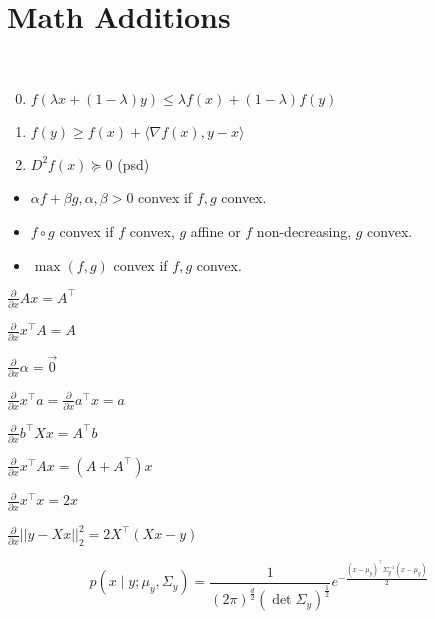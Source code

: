 \section{Math Additions}

\begin{definition}[Convexity] \
  \begin{enumerate}
    \setcounter{enumi}{-1}
    \item \(f(\lambda x + (1 - \lambda) y) \leq \lambda f(x) + (1 - \lambda)f(y)\)
    \item \(f(y) \geq f(x) + \langle \nabla f(x), y - x \rangle\)
    \item \(D^2f(x) \succeq 0\) (psd)
  \end{enumerate}
  \begin{itemize}
    \item \(\alpha f + \beta g, \alpha, \beta > 0\) convex if \(f, g\) convex.
    \item \(f \circ g\) convex if \(f\) convex, \(g\) affine or \(f\) non-decreasing, \(g\) convex.
    \item \(\max(f, g)\) convex if \(f, g\) convex.
  \end{itemize}
\end{definition}

\begin{definition}
  \begin{itemize*}
    \item \(\frac{\partial}{\partial x}Ax = A^\top\) \\
    \item \(\frac{\partial}{\partial x}x^\top A = A\)
    \item \(\frac{\partial}{\partial x} \alpha = \vec{0}\)
    \item \(\frac{\partial}{\partial x}x^\top a = \frac{\partial}{\partial x} a^\top x = a\)
    \item \(\frac{\partial}{\partial x} b^\top X x = A^\top b\)
    \item \(\frac{\partial}{\partial x} x^\top A x = (A + A^\top) x\) \\
    \item \(\frac{\partial}{\partial x} x^\top x = 2x\)
    \item \(\frac{\partial}{\partial x} ||y - Xx||_2^2 = 2X^\top (Xx - y)\)
  \end{itemize*}
\end{definition}

\begin{definition}
  \[p(x \mid y; \mu_y, \Sigma_y) = \frac{1}{(2\pi)^{\frac{d}{2}}(\det \Sigma_y)^{\frac{1}{2}}} e^{- \frac{(x - \mu_y)^\top \Sigma_y^{-1} (x - \mu_y)}{2}}\]
\end{definition}

